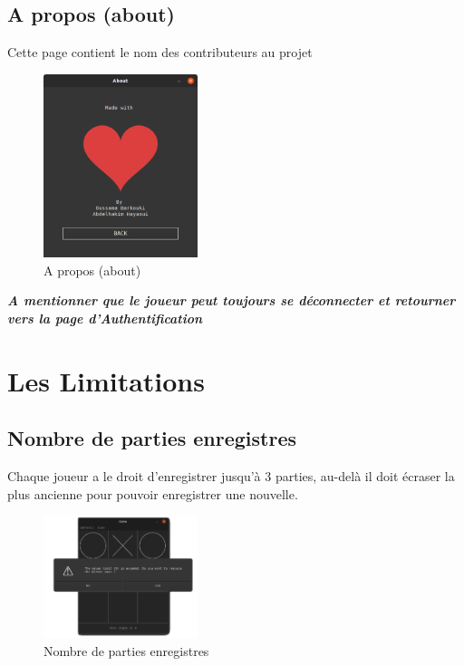 \subsection{A propos (about)}
Cette page contient le nom des contributeurs au projet 
\begin{figure}[H]
	\centering
	\includegraphics[width=0.4\textwidth]{about page .PNG}
	  \caption{A propos (about)}
	\label{fig:A propos (about)}
\end{figure}

 \textbf{\emph{A mentionner que le joueur peut toujours se déconnecter et retourner vers la page d’Authentification}}
\clearpage
\section{Les Limitations }\label{sec:section3}

\subsection{Nombre de parties enregistres }
Chaque joueur a le droit d’enregistrer jusqu’à  3 parties, au-delà il doit écraser la plus ancienne pour pouvoir enregistrer une nouvelle. 
\begin{figure}[H]
	\centering
	\includegraphics[width=0.4\textwidth]{exceded lmit saves finale.PNG}
	  \caption{Nombre de parties enregistres}
	\label{fig:Nombre de parties enregistres}
\end{figure}

